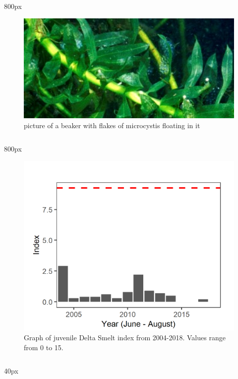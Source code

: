 \documentclass[
]{book}
\begin{document}
\begin{column}{800px\textwidth}
\begin{figure}

{\centering \includegraphics[width=4.74in]{figures/egeria} 

}

\caption{picture of a beaker with flakes of microcystis floating in it}\label{fig:unnamed-chunk-87}
\end{figure}
\end{column}

\begin{column}{800px\textwidth}
\begin{figure}
\includegraphics[width=15.25in]{figures/STN_DSM_rec} \caption{Graph of juvenile Delta Smelt index from 2004-2018. Values range from 0 to 15.}\label{fig:unnamed-chunk-88}
\end{figure}
\end{column}

\begin{column}{40px\textwidth}
~
\end{column}
\end{document}
